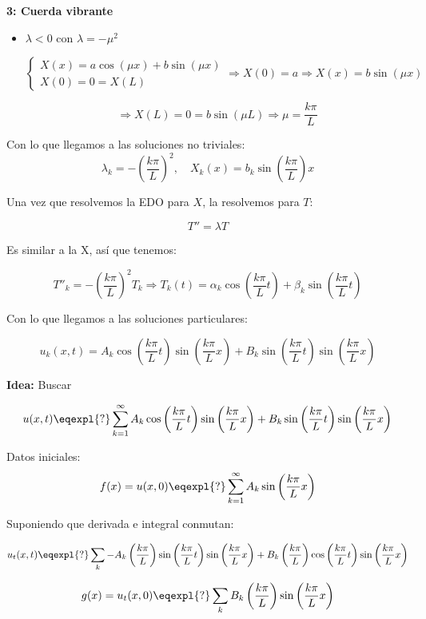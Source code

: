 \begin{example}{\bf 3: Cuerda vibrante}
\begin{itemize}
				\item $\lambda < 0$ con $\lambda = -\mu^2$

					\[
					\left\{
					\begin{array}{l}
					X(x) = a\cos(\mu x) + b\sin(\mu x) \\
					X(0) = 0 = X(L)
					\end{array}
					\right.
					\Rightarrow X(0) = a \Rightarrow X(x) = b \sin(\mu x)
					\]

					\[ \Rightarrow X(L) = 0 = b \sin (\mu L) \Rightarrow \mu = \frac{k \pi}{L}\]

			\end{itemize}

			Con lo que llegamos a las soluciones no triviales:
			\[\lambda_k = - (\frac{k\pi}{L})^2, \quad X_k(x) = b_k \sin \left(\frac{k\pi}{L} \right) x\]


			Una vez que resolvemos la EDO para $X$, la resolvemos para $T$:

			\[T'' = \lambda T\]

			Es similar a la X, así que tenemos:

			\[T''_k = - (\frac{k\pi}{L})^2 T_k \Rightarrow T_k (t) = \alpha_k \cos\left( \frac{k \pi}{L} t \right) + \beta_k \sin \left( \frac{k \pi}{L}t \right)\]

			Con lo que llegamos a las soluciones particulares:

			\[u_k(x,t) = A_k \cos \left(\frac{k\pi}{L} t\right) \sin \left(\frac{k\pi}{L}x\right) + B_k \sin \left(\frac{k\pi}{L}t\right)  \sin \left(\frac{k\pi}{L}x\right) \]

			{\bf Idea:} Buscar

			\[u(x,t) \eqexpl{?} \sum_{k=1}^{\infty} A_k \cos \left(\frac{k\pi}{L} t\right) \sin \left(\frac{k\pi}{L} x  \right)+ B_k \sin \left(\frac{k\pi}{L}t \right) \sin \left(\frac{k\pi}{L}  x \right)\]

			Datos iniciales:
			\[ f(x) = u(x,0) \eqexpl{?} \sum^{\infty}_{k=1} A_k \sin \left(\frac{k\pi}{L} x  \right)\]

			Suponiendo que derivada e integral conmutan:

			\[ u_t (x,t) \eqexpl{?} \sum_{k} - A_k \left(\frac{k\pi}{L} \right) \sin \left(\frac{k\pi}{L}t \right) \sin \left(\frac{k\pi}{L}x \right) + B_k \left(\frac{k\pi}{L} \right) \cos \left(\frac{k\pi}{L}t \right) \sin \left(\frac{k\pi}{L}x \right)
			\]

			\[g(x) = u_t(x,0) \eqexpl{?} \sum_k B_k  \left(\frac{k\pi}{L} \right) \sin \left(\frac{k\pi}{L}x \right)\]

		\end{example}

